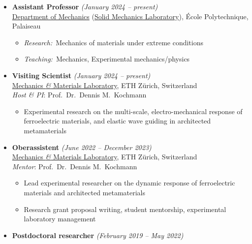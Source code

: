 \documentclass[a4paper,10pt, oneside]{article}
\begin{document}
	\begin{itemize}[wide, labelwidth=!, labelindent=-1em]
		\item[]\textbf{Assistant Professor} \hfill \textit{(January 2024 -- present)} \\
		\href{}{Department of Mechanics} (\href{https://portail.polytechnique.edu/lms/fr/accueil}{Solid Mechanics Laboratory}), {\'E}cole Polytechnique, Palaiseau
		\begin{itemize}[wide, labelwidth=!, labelindent=0em]
			\item \textit{Research:}~Mechanics of materials under extreme conditions
			\item \textit{Teaching:}~Mechanics, Experimental mechanics/physics		
		\end{itemize}
		\vspace*{0.5em}
		\item[]\textbf{Visiting Scientist} \hfill \textit{(January 2024 -- present)} \\
		\href{https://mm.ethz.ch/}{Mechanics \emph{\&} Materials Laboratory}, ETH Z\"{u}rich, Switzerland \\
		\textit{Host \& PI}: Prof.~Dr.~Dennis M.~Kochmann
		\begin{itemize}[wide, labelwidth=!, labelindent=0em]
			\item Experimental research on the multi-scale, electro-mechanical response of ferroelectric materials, and elastic wave guiding in architected metamaterials		
		\end{itemize}
		\vspace*{0.5em}
		\item[]\textbf{Oberassistent} \hfill \textit{(June 2022 -- December 2023)} \\
		\href{https://mm.ethz.ch/}{Mechanics \emph{\&} Materials Laboratory}, ETH Z\"{u}rich, Switzerland \\
		\textit{Mentor}: Prof.~Dr.~Dennis M.~Kochmann
		\begin{itemize}[wide, labelwidth=!, labelindent=0em]
			\item Lead experimental researcher on the dynamic response of ferroelectric materials and architected metamaterials
			\item Research grant proposal writing, student mentorship, experimental laboratory management		
		\end{itemize}
		\vspace*{0.5em}
		\item[]\textbf{Postdoctoral researcher} \hfill \textit{(February 2019 -- May 2022)} \\

\end{itemize}
\end{document}
